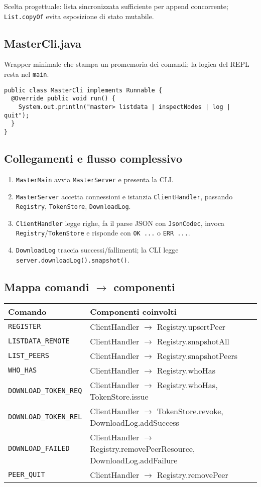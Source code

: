 \documentclass[a4paper,12pt]{article}
\begin{document}
Scelta progettuale: lista sincronizzata sufficiente per append concorrente; \texttt{List.copyOf} evita esposizione di stato mutabile.

\subsection*{MasterCli.java}
Wrapper minimale che stampa un promemoria dei comandi; la logica del REPL resta nel \texttt{main}.
\begin{lstlisting}
public class MasterCli implements Runnable {
  @Override public void run() {
    System.out.println("master> listdata | inspectNodes | log | quit");
  }
}
\end{lstlisting}

\subsection*{Collegamenti e flusso complessivo}
\begin{enumerate}[nosep]
  \item \texttt{MasterMain} avvia \texttt{MasterServer} e presenta la CLI.
  \item \texttt{MasterServer} accetta connessioni e istanzia \texttt{ClientHandler}, passando \texttt{Registry}, \texttt{TokenStore}, \texttt{DownloadLog}.
  \item \texttt{ClientHandler} legge righe, fa il parse JSON con \texttt{JsonCodec}, invoca \texttt{Registry}/\texttt{TokenStore} e risponde con \texttt{OK ...} o \texttt{ERR ...}.
  \item \texttt{DownloadLog} traccia successi/fallimenti; la CLI legge \texttt{server.downloadLog().snapshot()}.
\end{enumerate}

\subsection*{Mappa comandi \texorpdfstring{$\rightarrow$}{->} componenti}
\begin{tabular}{@{}p{4.2cm}p{10cm}@{}}
\toprule
Comando & Componenti coinvolti \\
\midrule
\texttt{REGISTER}            & ClientHandler $\rightarrow$ Registry.upsertPeer \\
\texttt{LISTDATA\_REMOTE}    & ClientHandler $\rightarrow$ Registry.snapshotAll \\
\texttt{LIST\_PEERS}         & ClientHandler $\rightarrow$ Registry.snapshotPeers \\
\texttt{WHO\_HAS}            & ClientHandler $\rightarrow$ Registry.whoHas \\
\texttt{DOWNLOAD\_TOKEN\_REQ}& ClientHandler $\rightarrow$ Registry.whoHas, TokenStore.issue \\
\texttt{DOWNLOAD\_TOKEN\_REL}& ClientHandler $\rightarrow$ TokenStore.revoke, DownloadLog.addSuccess \\
\texttt{DOWNLOAD\_FAILED}    & ClientHandler $\rightarrow$ Registry.removePeerResource, DownloadLog.addFailure \\
\texttt{PEER\_QUIT}          & ClientHandler $\rightarrow$ Registry.removePeer \\
\bottomrule
\end{tabular}
\end{document}
